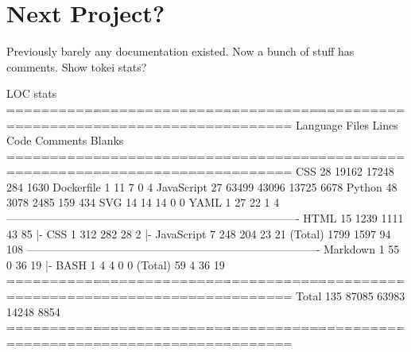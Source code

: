 % 

\section{Next Project?}

\begin{frame}[c]
    Previously barely any documentation existed. Now a bunch of stuff has comments.
    Show tokei stats?
\end{frame}

\begin{frame}[c]{LOC stats}
===============================================================================
 Language            Files        Lines         Code     Comments       Blanks
===============================================================================
 CSS                    28        19162        17248          284         1630
 Dockerfile              1           11            7            0            4
 JavaScript             27        63499        43096        13725         6678
 Python                 48         3078         2485          159          434
 SVG                    14           14           14            0            0
 YAML                    1           27           22            1            4
-------------------------------------------------------------------------------
 HTML                   15         1239         1111           43           85
 |- CSS                  1          312          282           28            2
 |- JavaScript           7          248          204           23           21
 (Total)                           1799         1597           94          108
-------------------------------------------------------------------------------
 Markdown                1           55            0           36           19
 |- BASH                 1            4            4            0            0
 (Total)                             59            4           36           19
===============================================================================
 Total                 135        87085        63983        14248         8854
===============================================================================
\end{frame}

